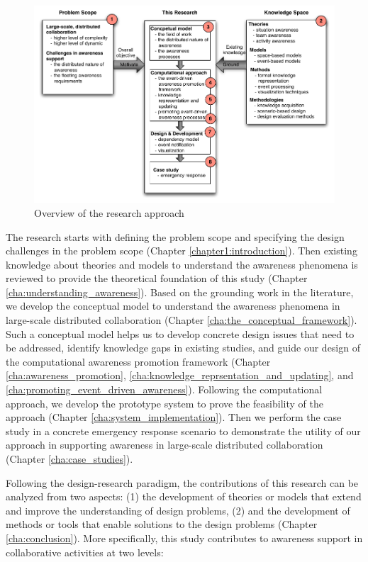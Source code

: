 \begin{figure}[htbp] %
   \centering
   \includegraphics[width=5.8in]{research_overview.pdf} 
   \caption{Overview of the research approach}
   \label{fig:research_overview}
\end{figure}

The research starts with defining the problem scope and specifying the design challenges in the problem scope (Chapter \ref{chapter1:introduction}). Then existing knowledge about theories and models to understand the awareness phenomena is reviewed to provide the theoretical foundation of this study (Chapter \ref{cha:understanding_awareness}). Based on the grounding work in the literature, we develop the conceptual model to understand the awareness phenomena in large-scale distributed collaboration (Chapter \ref{cha:the_conceptual_framework}). Such a conceptual model helps us to develop concrete design issues that need to be addressed, identify knowledge gaps in existing studies, and guide our design of the computational awareness promotion framework (Chapter \ref{cha:awareness_promotion}, \ref{cha:knowledge_reprsentation_and_updating}, and \ref{cha:promoting_event_driven_awareness}). Following the computational approach, we develop the prototype system to prove the feasibility of the approach (Chapter \ref{cha:system_implementation}). Then we perform the case study in a concrete emergency response scenario to demonstrate the utility of our approach in supporting awareness in large-scale distributed collaboration (Chapter \ref{cha:case_studies}). 

Following the design-research paradigm, the contributions of this research can be analyzed from two aspects: (1) the development of theories or models that extend and improve the understanding of design problems, (2) and the development of methods or tools that enable solutions to the design problems (Chapter \ref{cha:conclusion}). More specifically, this study contributes to awareness support in collaborative activities at two levels:


